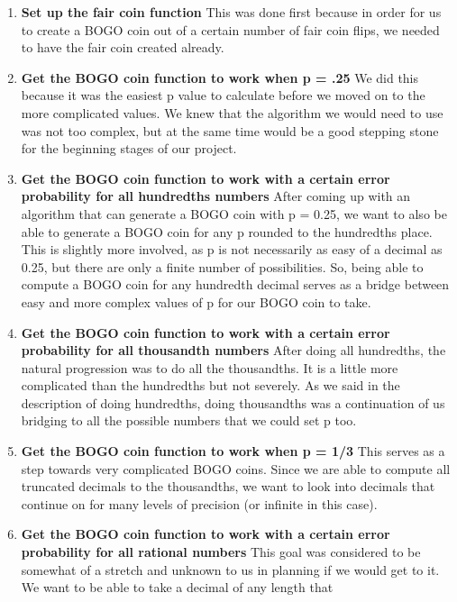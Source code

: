 \documentclass[11pt]{article}
\begin{document}
\begin{enumerate}
    \item \textbf{Set up the fair coin function}
        \subitem This was done first because in order for us to create a BOGO coin out of a certain 
        number of fair coin flips, we needed to have the fair coin created already.
    \item \textbf{Get the BOGO coin function to work when p = .25}
        \subitem We did this because it was the easiest p value to calculate before we moved on to the
        more complicated values. We knew that the algorithm we would need to use was not
        too complex, but at the same time would be a good stepping stone for the beginning
    stages of our project.
    \item \textbf{Get the BOGO coin function to work with a certain error probability
    for all hundredths numbers}
        \subitem After coming up with an algorithm that can generate a BOGO coin with p = 0.25, 
        we want to also be able to generate a BOGO coin for any p rounded to the hundredths 
        place. This is slightly more involved, as p is not necessarily as easy of a decimal as 
        0.25, but there are only a finite number of possibilities. So, being able to compute 
        a BOGO coin for any hundredth decimal serves as a bridge between easy and more complex 
        values of p for our BOGO coin to take.
    \item \textbf{Get the BOGO coin function to work with a certain error probability
    for all thousandth numbers}
        \subitem After doing all hundredths, the natural progression was to do all the thousandths.
        It is a little more complicated than the hundredths but not severely. As we said in the
        description of doing hundredths, doing thousandths was a continuation of us bridging to
        all the possible numbers that we could set p too. 
    \item \textbf{Get the BOGO coin function to work when p = 1/3}
        \subitem This serves as a step towards very complicated BOGO coins. Since we are able to 
        compute all truncated decimals to the thousandths, we want to look into decimals that 
        continue on for many levels of precision (or infinite in this case).
    \item \textbf{Get the BOGO coin function to work with a certain error probability
    for all rational numbers}
        \subitem This goal was considered to be somewhat of a stretch and unknown to us in 
        planning if we would get to it. We want to be able to take a decimal of any length that 

\end{enumerate}
\end{document}
